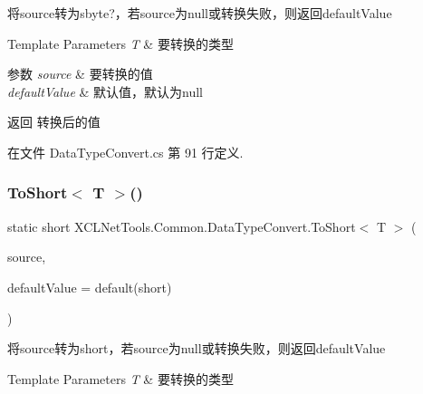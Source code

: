 将source转为sbyte?，若source为null或转换失败，则返回default\+Value 


\begin{DoxyTemplParams}{Template Parameters}
{\em T} & 要转换的类型\\
\hline
\end{DoxyTemplParams}

\begin{DoxyParams}{参数}
{\em source} & 要转换的值\\
\hline
{\em default\+Value} & 默认值，默认为null\\
\hline
\end{DoxyParams}
\begin{DoxyReturn}{返回}
转换后的值
\end{DoxyReturn}


在文件 Data\+Type\+Convert.\+cs 第 91 行定义.

\mbox{\label{class_x_c_l_net_tools_1_1_common_1_1_data_type_convert_a2f311afdf05703ddfc64d2c897d39e1f}} 
\subsubsection{\texorpdfstring{To\+Short$<$ T $>$()}{ToShort< T >()}}
{\footnotesize\ttfamily static short X\+C\+L\+Net\+Tools.\+Common.\+Data\+Type\+Convert.\+To\+Short$<$ T $>$ (\begin{DoxyParamCaption}\item[{T}]{source,  }\item[{short}]{default\+Value = {\ttfamily default(short)} }\end{DoxyParamCaption})\hspace{0.3cm}{\ttfamily [static]}}



将source转为short，若source为null或转换失败，则返回default\+Value 


\begin{DoxyTemplParams}{Template Parameters}
{\em T} & 要转换的类型\\
\hline
\end{DoxyTemplParams}

